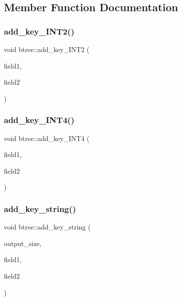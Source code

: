 \subsection{Member Function Documentation}
\mbox{\label{classbtree_a4d0d3b843c9ae081d5fc0325dbdddea7}} 
\subsubsection{\texorpdfstring{add\+\_\+key\+\_\+\+I\+N\+T2()}{add\_key\_INT2()}}
{\footnotesize\ttfamily void btree\+::add\+\_\+key\+\_\+\+I\+N\+T2 (\begin{DoxyParamCaption}\item[{\mbox{\hyperlink{galois_8h_a09fddde158a3a20bd2dcadb609de11dc}{I\+NT}}}]{field1,  }\item[{\mbox{\hyperlink{galois_8h_a09fddde158a3a20bd2dcadb609de11dc}{I\+NT}}}]{field2 }\end{DoxyParamCaption})}

\mbox{\label{classbtree_a4c42710e5f8cb4e3991d591fe2ae6f42}} 
\subsubsection{\texorpdfstring{add\+\_\+key\+\_\+\+I\+N\+T4()}{add\_key\_INT4()}}
{\footnotesize\ttfamily void btree\+::add\+\_\+key\+\_\+\+I\+N\+T4 (\begin{DoxyParamCaption}\item[{\mbox{\hyperlink{galois_8h_a09fddde158a3a20bd2dcadb609de11dc}{I\+NT}}}]{field1,  }\item[{\mbox{\hyperlink{galois_8h_a09fddde158a3a20bd2dcadb609de11dc}{I\+NT}}}]{field2 }\end{DoxyParamCaption})}

\mbox{\label{classbtree_a291b3c61b9df78471a385b990e926d66}} 
\subsubsection{\texorpdfstring{add\+\_\+key\+\_\+string()}{add\_key\_string()}}
{\footnotesize\ttfamily void btree\+::add\+\_\+key\+\_\+string (\begin{DoxyParamCaption}\item[{\mbox{\hyperlink{galois_8h_a09fddde158a3a20bd2dcadb609de11dc}{I\+NT}}}]{output\+\_\+size,  }\item[{\mbox{\hyperlink{galois_8h_a09fddde158a3a20bd2dcadb609de11dc}{I\+NT}}}]{field1,  }\item[{\mbox{\hyperlink{galois_8h_a09fddde158a3a20bd2dcadb609de11dc}{I\+NT}}}]{field2 }\end{DoxyParamCaption})}

